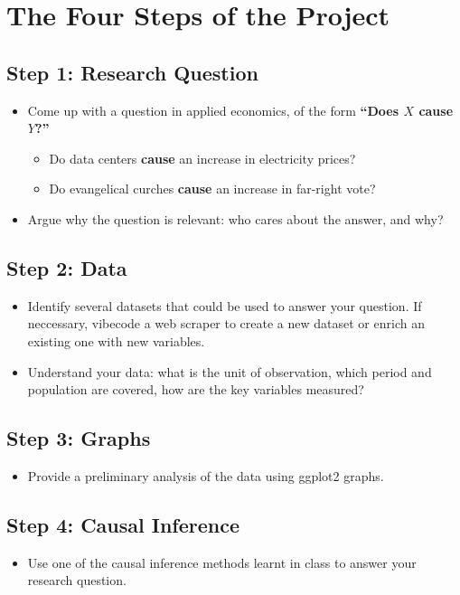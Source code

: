 \documentclass[11pt]{article}
\begin{document}
\section{The Four Steps of the Project}

\subsection{Step 1: Research Question}
\begin{itemize}
    \item Come up with a question in applied economics, of the form \textbf{``Does $X$ cause $Y$?''} 
    \begin{itemize}
        \item Do data centers \textbf{cause} an increase in electricity prices? 
        \item Do evangelical curches \textbf{cause} an increase in far-right vote?
    \end{itemize}
    \item Argue why the question is relevant: who cares about the answer, and why?
\end{itemize}

\subsection{Step 2: Data}
\begin{itemize}
    \item Identify several datasets that could be used to answer your question. If neccessary, vibecode a web scraper to create a new dataset or enrich an existing one with new variables.
    \item Understand your data: what is the unit of observation, which period and population are covered, how are the key variables measured?
\end{itemize}

\subsection{Step 3: Graphs}
\begin{itemize}
    \item Provide a preliminary analysis of the data using ggplot2 graphs.
\end{itemize}

\subsection{Step 4: Causal Inference}
\begin{itemize}
    \item Use one of the causal inference methods learnt in class to answer your research question.
\end{itemize}
\end{document}
